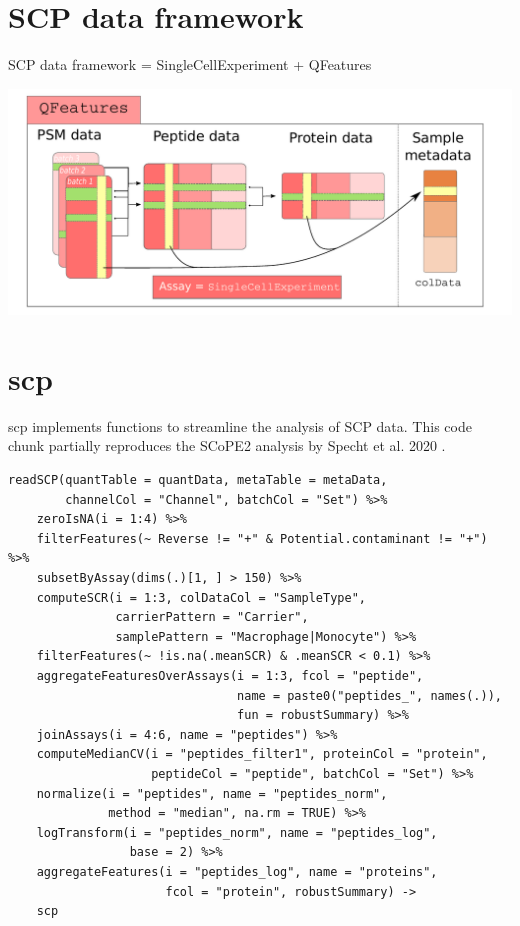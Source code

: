\documentclass{article}
\newcommand{\hcode}[2][lgray]{{\ttfamily\color{vdgray}\colorbox{#1}{#2}}}
\begin{document}
\begin{multicols}{2}
\begin{minipage}[t]{\linewidth}
  \section*{\huge SCP data framework}
  
  \large
  SCP data framework = \hcode{SingleCellExperiment}\cite{SCE} +
  \hcode{QFeatures}\cite{QFeatures}
  
  \centering
  \includegraphics[width=0.7\linewidth]{figs/SCP_framework.pdf}
\end{minipage}

\noindent
\begin{minipage}[t]{\linewidth}
  \vspace{0.55cm}
  \section*{\huge \hcode{scp}}
  
  \hcode{scp} implements functions to streamline the analysis of SCP
  data. This code chunk partially reproduces the SCoPE2 analysis by 
  Specht et al. 2020 \cite{Specht2020-jm}.
  
  \begin{lstlisting}
readSCP(quantTable = quantData, metaTable = metaData,
        channelCol = "Channel", batchCol = "Set") %>%
    zeroIsNA(i = 1:4) %>%
    filterFeatures(~ Reverse != "+" & Potential.contaminant != "+") %>%
    subsetByAssay(dims(.)[1, ] > 150) %>%
    computeSCR(i = 1:3, colDataCol = "SampleType",
               carrierPattern = "Carrier",
               samplePattern = "Macrophage|Monocyte") %>%
    filterFeatures(~ !is.na(.meanSCR) & .meanSCR < 0.1) %>%
    aggregateFeaturesOverAssays(i = 1:3, fcol = "peptide",
                                name = paste0("peptides_", names(.)),
                                fun = robustSummary) %>%
    joinAssays(i = 4:6, name = "peptides") %>%
    computeMedianCV(i = "peptides_filter1", proteinCol = "protein",
                    peptideCol = "peptide", batchCol = "Set") %>%
    normalize(i = "peptides", name = "peptides_norm",
              method = "median", na.rm = TRUE) %>%
    logTransform(i = "peptides_norm", name = "peptides_log",
                 base = 2) %>%
    aggregateFeatures(i = "peptides_log", name = "proteins",
                      fcol = "protein", robustSummary) ->
    scp
  \end{lstlisting}


\end{minipage}
\end{multicols}
\end{document}
